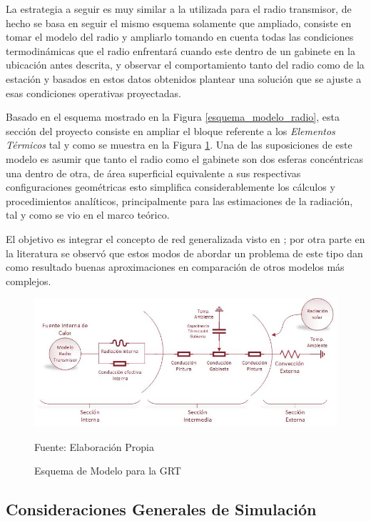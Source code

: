 La estrategia a seguir es muy similar a la utilizada para el radio transmisor, de hecho se basa en seguir el mismo esquema solamente que ampliado, consiste en tomar el modelo del radio y ampliarlo tomando en cuenta todas las condiciones termodinámicas que el radio enfrentará cuando este dentro de un gabinete en la ubicación antes descrita, y observar el comportamiento tanto del radio como de la estación y basados en estos datos obtenidos plantear una solución que se ajuste a esas condiciones operativas proyectadas.

Basado en el esquema mostrado en la Figura \ref{esquema_modelo_radio}, esta sección del proyecto consiste en ampliar el bloque referente a los \textit{Elementos Térmicos} tal y como se muestra en la Figura \ref{esquema modelo general}. Una de las suposiciones de este modelo es asumir que tanto el radio como el gabinete son dos esferas concéntricas una dentro de otra, de área superficial equivalente a sus respectivas configuraciones geométricas esto simplifica considerablemente los cálculos y procedimientos analíticos, principalmente para las estimaciones de la radiación, tal y como se vio en el marco teórico.

El objetivo es integrar el concepto de red generalizada visto en \cite{alfaro}; por otra parte en la literatura se observó que estos modos de abordar un problema de este tipo dan como resultado buenas aproximaciones en comparación de otros modelos más complejos.\cite{realtime}

\begin{figure}[H]
\centering
\includegraphics[scale=0.75]{Figuras/Esquema_de_Modelo_general.jpg}
\caption{Esquema de Modelo para la GRT}
Fuente: Elaboración Propia \label{esquema modelo general}
\end{figure}

\subsection{Consideraciones Generales de Simulación}

